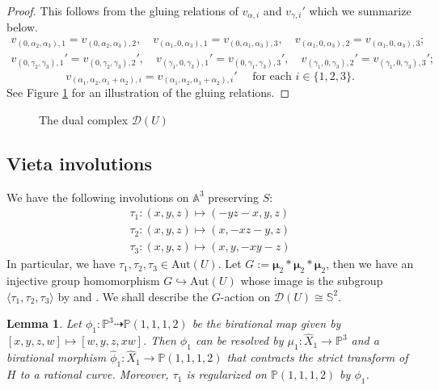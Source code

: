 \documentclass[reqno, 12pt]{amsart}
\newtheorem{lem}[prop]{Lemma}
\theoremstyle{definition}
\newcommand{\bP}{\mathbb{P}}
\newcommand{\bA}{\mathbb{A}}
\newcommand{\bS}{\mathbb{S}}
\newcommand{\cD}{\mathcal{D}}
\newcommand{\hX}{\widehat{X}}
\newcommand{\Aut}{\mathrm{Aut}}
\newcommand{\bmu}{\boldsymbol{\mu}}
\numberwithin{equation}{section}
\begin{document}
\begin{proof}
This follows from the gluing relations of $v_{\alpha,i}$ and $v_{\gamma, i}'$ which we summarize below.
\begin{align*}
v_{(0, \alpha_2, \alpha_3),1} = v_{(0, \alpha_2, \alpha_3), 2}, \quad v_{(\alpha_1, 0, \alpha_3),1} = v_{(0, \alpha_1, \alpha_3), 3}, \quad v_{(\alpha_1,0, \alpha_3),2} = v_{(\alpha_1, 0, \alpha_3), 3};\\
v_{(0, \gamma_2, \gamma_3),1}' = v_{(0, \gamma_2, \gamma_3), 2}', \quad v_{(\gamma_1, 0, \gamma_3),1}' = v_{(0, \gamma_1, \gamma_3), 3}', \quad v_{(\gamma_1,0, \gamma_3),2}' = v_{(\gamma_1, 0, \gamma_3), 3}';
\end{align*}
\[
v_{(\alpha_1, \alpha_2, \alpha_1+\alpha_2), i} = v_{(\alpha_1, \alpha_2, \alpha_1+\alpha_2), i}'\quad \textrm{ for each } i\in \{1,2,3\}.
\]
See Figure \ref{fig:dualcx} for an illustration of the gluing relations. 
\end{proof}


\begin{figure}[htbp] %
    \centering
    \caption{The dual complex $\cD(U)$}
    \label{fig:dualcx}
\end{figure}




\subsection{Vieta involutions}\label{sec:Vieta}
We have the following involutions on $\bA^3$ preserving $S$:
\begin{align*}
\tau_1: (x,y,z)\mapsto (-yz-x, y,z)\\
\tau_2: (x,y,z) \mapsto (x, -xz-y, z)\\
\tau_3: (x,y,z) \mapsto (x, y, -xy-z)
\end{align*}
In particular, we have $\tau_1, \tau_2, \tau_3\in \Aut(U)$. 
Let $G:=\bmu_2 * \bmu_2 * \bmu_2$, then we have an injective group homomorphism $G\hookrightarrow\Aut(U)$ whose image is the subgroup $\langle\tau_1, \tau_2, \tau_3\rangle$ by \cite[Theorem 1]{EH74} and \cite[Theorem 3.1]{CL09}. We shall describe the $G$-action on $\cD(U)\cong \bS^2$. 

\begin{lem}
Let $\phi_1:\bP^3 \dashrightarrow \bP(1,1,1,2)$ be the birational map given by $[x,y,z, w]\mapsto [w, y, z, xw]$. Then $\phi_1$ can be resolved by $\mu_1:\hX_1\to\bP^3$ and a birational morphism $\hat{\phi}_1: \hX_1\to \bP(1,1,1,2)$ that contracts the strict transform of $H$ to a rational curve. Moreover, $\tau_1$ is regularized on $\bP(1,1,1,2)$ by $\phi_1$. 
\end{lem}
\end{document}
